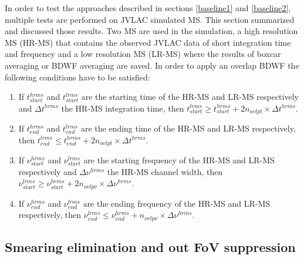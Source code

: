 \documentclass[useAMS,usenatbib]{mn2e}
\begin{document}
In order to test the approaches described in sections \ref{baseline1} and \ref{baseline2}, multiple tests are performed on JVLAC 
simulated MS. This section summarized and discussed those results. Two MS are used in 
the simulation, a high resolution MS (HR-MS) that contains the observed JVLAC data of short integration time and frequency and a low 
resolution 
MS (LR-MS) where the results of boxcar averaging or BDWF averaging are saved. In order to apply an overlap BDWF  the following 
conditions have to be satisfied:
\begin{enumerate}
 \item If $t^{hrms}_{start}$ and $t^{lrms}_{start}$ are the starting time of the HR-MS and LR-MS respectively and  $\Delta t^{hrms}$ the 
HR-MS integration time, then 
	    $t^{lrms}_{start}\geq t^{hrms}_{start} + 2n_{ovlpt}\times \Delta t^{hrms}$. 
  \item If $t^{hrms}_{end}$ and $t^{lrms}_{end}$ are the ending time of the HR-MS and LR-MS respectively, then 
	    $t^{lrms}_{end}\leq t^{hrms}_{end} + 2n_{ovlpt}\times \Delta t^{hrms}$. 
 \item If $\nu^{hrms}_{start}$ and $\nu^{lrms}_{start}$ are the starting frequency of the HR-MS and LR-MS respectively and  $\Delta 
\nu^{hrms}$ the HR-MS channel width, then 
	    $\nu^{lrms}_{start} \geq \nu^{hrms}_{start} + 2n_{ovlp\nu}\times \Delta \nu^{hrms}$. 
 \item If $\nu^{hrms}_{end}$ and $\nu^{lrms}_{end}$ are the ending frequency of the HR-MS and LR-MS respectively, then 
	    $\nu^{lrms}_{end} \leq \nu^{hrms}_{end} + n_{ovlp\nu}\times \Delta \nu^{hrms}$. 
\end{enumerate}

\subsection{Smearing elimination and out FoV suppression}
\end{document}
